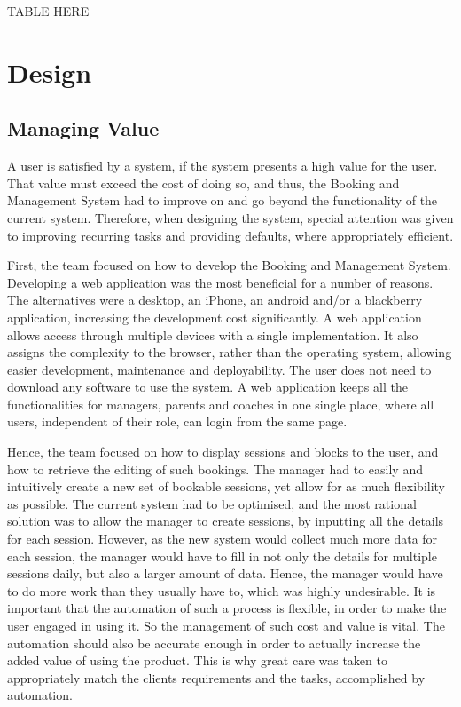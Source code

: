 \documentclass{l3proj}
\begin{document}
{\LARGE{TABLE HERE}}


\chapter{Design}
\label{design}

\section{Managing Value}
\par
A user is satisfied by a system, if the system presents a high value for the user. That value must exceed the cost of doing so, and thus, the Booking and Management System had  to improve on and go beyond the functionality of the current system. Therefore, when designing the system, special attention was given to improving recurring tasks and providing defaults, where appropriately efficient. \\
\par First, the team focused on how to develop the Booking and Management System. Developing a web application was the most beneficial for a number of reasons. The alternatives were a desktop, an iPhone, an android and/or a blackberry application, increasing the development cost significantly. A web application allows access through multiple devices with a single implementation. It also assigns the complexity to the browser, rather than the operating system, allowing easier development, maintenance and deployability. The user does not need to download any software to use the system. A web application keeps all the functionalities for managers, parents and coaches in one single place, where all users, independent of their role, can login from the same page.\\
\par Hence, the team focused on how to display sessions and blocks to the user, and how to retrieve the editing of such bookings. The manager had to easily and intuitively create a new set of bookable sessions, yet allow for as much flexibility as possible. The current system had to be optimised, and the most rational solution was to allow the manager to create sessions, by inputting all the details for each session. However, as the new system would collect much more data for each session, the manager would have to fill in not only the details for multiple sessions daily, but also a larger amount of data. Hence, the manager would have to do more work than they usually have to, which was highly undesirable. It is important that the automation of such a process is flexible, in order to make the user engaged in using it. So the management of such cost and value is vital. The automation should also be accurate enough in order to actually increase the added value of using the product. This is why great care was taken to appropriately match the clients requirements and the tasks, accomplished by automation.\\
\end{document}

